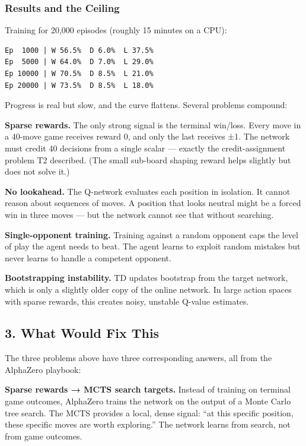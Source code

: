 \hypertarget{results-and-the-ceiling}{%
\subsubsection{Results and the Ceiling}\label{results-and-the-ceiling}}

Training for 20,000 episodes (roughly 15 minutes on a CPU):

\begin{verbatim}
Ep  1000 | W 56.5%  D 6.0%  L 37.5%
Ep  5000 | W 64.0%  D 7.0%  L 29.0%
Ep 10000 | W 70.5%  D 8.5%  L 21.0%
Ep 20000 | W 73.5%  D 8.5%  L 18.0%
\end{verbatim}

Progress is real but slow, and the curve flattens. Several problems
compound:

\textbf{Sparse rewards.} The only strong signal is the terminal
win/loss. Every move in a 40-move game receives reward 0, and only the
last receives ±1. The network must credit 40 decisions from a single
scalar --- exactly the credit-assignment problem T2 described. (The
small sub-board shaping reward helps slightly but does not solve it.)

\textbf{No lookahead.} The Q-network evaluates each position in
isolation. It cannot reason about sequences of moves. A position that
looks neutral might be a forced win in three moves --- but the network
cannot see that without searching.

\textbf{Single-opponent training.} Training against a random opponent
caps the level of play the agent needs to beat. The agent learns to
exploit random mistakes but never learns to handle a competent opponent.

\textbf{Bootstrapping instability.} TD updates bootstrap from the target
network, which is only a slightly older copy of the online network. In
large action spaces with sparse rewards, this creates noisy, unstable
Q-value estimates.

\hypertarget{what-would-fix-this}{%
\subsection{3. What Would Fix This}\label{what-would-fix-this}}

The three problems above have three corresponding answers, all from the
AlphaZero playbook:

\textbf{Sparse rewards → MCTS search targets.} Instead of training on
terminal game outcomes, AlphaZero trains the network on the output of a
Monte Carlo tree search. The MCTS provides a local, dense signal: ``at
this specific position, these specific moves are worth exploring.'' The
network learns from search, not from game outcomes.


